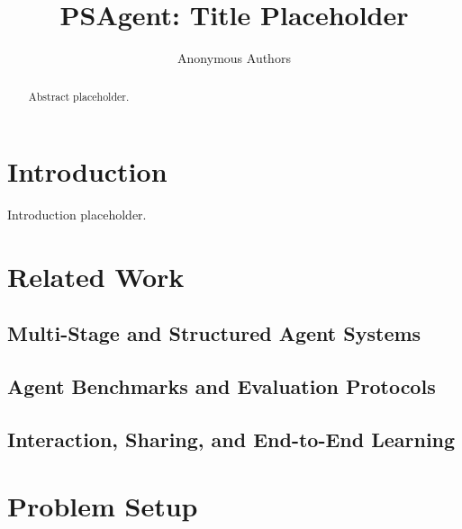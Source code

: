 \documentclass{article}
\title{PSAgent: Title Placeholder}
\author{Anonymous Authors}
\begin{document}
\maketitle

\begin{abstract}
Abstract placeholder.
\end{abstract}

\section{Introduction}

Introduction placeholder.




\section{Related Work}

\subsection{Multi-Stage and Structured Agent Systems}

\subsection{Agent Benchmarks and Evaluation Protocols}

\subsection{Interaction, Sharing, and End-to-End Learning}


\section{Problem Setup}
\end{document}
